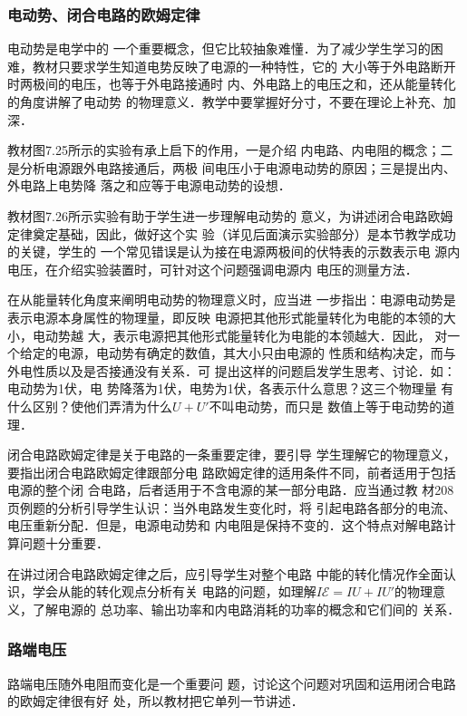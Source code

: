 \subsubsection{电动势、闭合电路的欧姆定律} 

电动势是电学中的
一个重要概念，但它比较抽象难懂．为了减少学生学习的困
难，教材只要求学生知道电势反映了电源的一种特性，它的
大小等于外电路断开时两极间的电压，也等于外电路接通时
内、外电路上的电压之和，还从能量转化的角度讲解了电动势
的物理意义．教学中要掌握好分寸，不要在理论上补充、加深．

教材图7.25所示的实验有承上启下的作用，一是介绍
内电路、内电阻的概念；二是分析电源跟外电路接通后，两极
间电压小于电源电动势的原因；三是提出内、外电路上电势降
落之和应等于电源电动势的设想．

教材图7.26所示实验有助于学生进一步理解电动势的
意义，为讲述闭合电路欧姆定律奠定基础，因此，做好这个实
验（详见后面演示实验部分）是本节教学成功的关键，学生的
一个常见错误是认为接在电源两极间的伏特表的示数表示电
源内电压，在介绍实验装置时，可针对这个问题强调电源内
电压的测量方法．

在从能量转化角度来阐明电动势的物理意义时，应当进
一步指出：电源电动势是表示电源本身属性的物理量，即反映
电源把其他形式能量转化为电能的本领的大小，电动势越
大，表示电源把其他形式能量转化为电能的本领越大．因此，
对一个给定的电源，电动势有确定的数值，其大小只由电源的
性质和结构决定，而与外电性质以及是否接通没有关系．可
提出这样的问题启发学生思考、讨论．如：电动势为1伏，电
势降落为1伏，电势为1伏，各表示什么意思？这三个物理量
有什么区别？使他们弄清为什么$U+U'$不叫电动势，而只是
数值上等于电动势的道理．

闭合电路欧姆定律是关于电路的一条重要定律，要引导
学生理解它的物理意义，要指出闭合电路欧姆定律跟部分电
路欧姆定律的适用条件不同，前者适用于包括电源的整个闭
合电路，后者适用于不含电源的某一部分电路．应当通过教
材208页例题的分析引导学生认识：当外电路发生变化时，将
引起电路各部分的电流、电压重新分配．但是，电源电动势和
内电阻是保持不变的．这个特点对解电路计算问题十分重要．

在讲过闭合电路欧姆定律之后，应引导学生对整个电路
中能的转化情况作全面认识，学会从能的转化观点分析有关
电路的问题，如理解$I\mathcal{E}=IU+IU'$的物理意义，了解电源的
总功率、输出功率和内电路消耗的功率的概念和它们间的
关系．

\subsubsection{路端电压}

路端电压随外电阻而变化是一个重要问
题，讨论这个问题对巩固和运用闭合电路的欧姆定律很有好
处，所以教材把它单列一节讲述．

